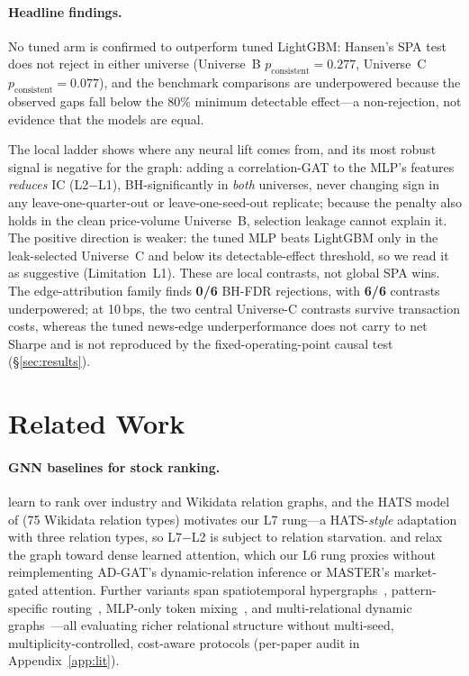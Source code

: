 \documentclass{article}
\begin{document}
\paragraph{Headline findings.} No tuned arm is confirmed to outperform tuned LightGBM: Hansen's SPA test does not reject in either universe (Universe~B $p_{\text{consistent}}=0.277$, Universe~C $p_{\text{consistent}}=0.077$), and the benchmark comparisons are underpowered because the observed gaps fall below the 80\% minimum detectable effect---a non-rejection, not evidence that the models are equal.

The local ladder shows where any neural lift comes from, and its most robust signal is negative for the graph: adding a correlation-GAT to the MLP's features \emph{reduces} IC (L2$-$L1), BH-significantly in \emph{both} universes, never changing sign in any leave-one-quarter-out or leave-one-seed-out replicate; because the penalty also holds in the clean price-volume Universe~B, selection leakage cannot explain it. The positive direction is weaker: the tuned MLP beats LightGBM only in the leak-selected Universe~C and below its detectable-effect threshold, so we read it as suggestive (Limitation~L1). These are local contrasts, not global SPA wins. The edge-attribution family finds \textbf{0/6} BH-FDR rejections, with \textbf{6/6} contrasts underpowered; at 10\,bps, the two central Universe-C contrasts survive transaction costs, whereas the tuned news-edge underperformance does not carry to net Sharpe and is not reproduced by the fixed-operating-point causal test (\S\ref{sec:results}).

\section{Related Work}\label{sec:related}

\paragraph{GNN baselines for stock ranking.} \citet{feng2019temporal} learn to rank over industry and Wikidata relation graphs, and the HATS model of \citet{kim2019hats} (75 Wikidata relation types) motivates our L7 rung---a HATS-\emph{style} adaptation with three relation types, so L7$-$L2 is subject to relation starvation. \citet{cheng2021adgat} and \citet{li2024master} relax the graph toward dense learned attention, which our L6 rung proxies without reimplementing AD-GAT's dynamic-relation inference or MASTER's market-gated attention. Further variants span spatiotemporal hypergraphs~\citep{sawhney2021sthansr}, pattern-specific routing~\citep{lin2021tra}, MLP-only token mixing~\citep{fan2024stockmixer}, and multi-relational dynamic graphs~\citep{qian2024mdgnn}---all evaluating richer relational structure without multi-seed, multiplicity-controlled, cost-aware protocols (per-paper audit in Appendix~\ref{app:lit}).
\end{document}
